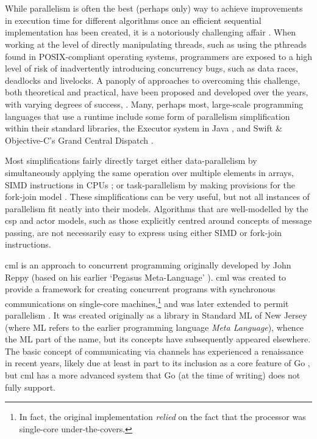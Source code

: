 \section{\label{sec:back:cml}}

While parallelism is often the best (perhaps only) way to achieve improvements in execution time for different algorithms once an efficient sequential implementation has been created, it is a notoriously challenging affair \cite{Shun2017}.  When working at the level of directly manipulating threads, such as using the pthreads found in POSIX-compliant operating systems, programmers are exposed to a high level of risk of inadvertently introducing concurrency bugs, such as data races, deadlocks and livelocks.  A panoply of approaches to overcoming this challenge, both theoretical and practical, have been proposed and developed over the years, with varying degrees of success, \eg{} \cite{Boyapati2002,Bocq2012,Seinstra2004}.  Many, perhaps most, large-scale programming languages that use a runtime include some form of parallelism simplification within their standard libraries, \eg{} the Executor system in Java \cite[Ch. 4]{Fernandez2012}, and Swift \& Objective-C's Grand Central Dispatch \cite{Maskrey2018}.

Most simplifications fairly directly target either data-parallelism by simultaneously applying the same operation over multiple elements in arrays, \eg{} SIMD instructions in CPUs \cite{Hughes2015}; or task-parallelism by making provisions for the fork-join model \cite{McCool2012}.  These simplifications can be very useful, but not all instances of parallelism fit neatly into their models.  Algorithms that are well-modelled by the \Gls{csp} and \Gls{actor} models, such as those explicitly centred around concepts of message passing, are not necessarily easy to express using either SIMD or fork-join instructions.

\Gls{cml} \cite{Reppy1991,Panangaden1997} is an approach to concurrent programming originally developed by John Reppy (based on his earlier `Pegasus Meta-Language' \cite{Reppy1988}).  \Gls{cml} was created to provide a framework for creating concurrent programs with synchronous communications on single-core machines,\footnote{In fact, the original implementation \emph{relied} on the fact that the processor was single-core under-the-covers.} and was later extended to permit parallelism \cite{Reppy2009a}.  It was created originally as a library in Standard ML of New Jersey (where ML refers to the earlier programming language \textit{Meta Language}), whence the ML part of the name, but its concepts have subsequently appeared elsewhere.  The basic concept of communicating via channels has experienced a renaissance in recent years, likely due at least in part to its inclusion as a core feature of Go \cite{Meyerson2014}, but \gls{cml} has a more advanced system that Go (at the time of writing) does not fully support.

